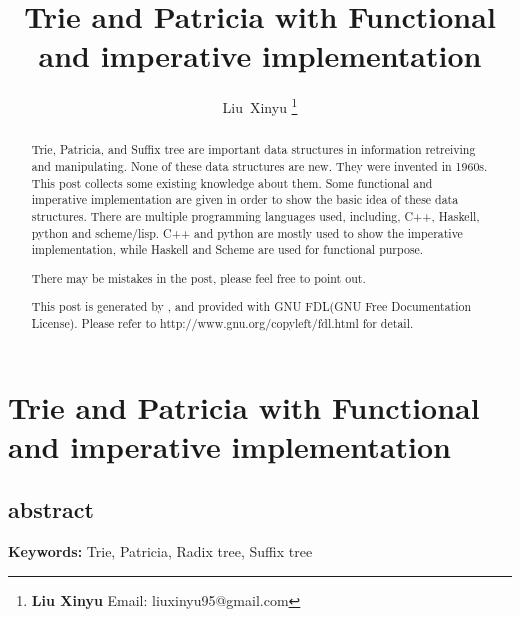\documentclass{article}
\begin{document}
\fi


\title{Trie and Patricia with Functional and imperative implementation}

\author{Liu~Xinyu
\thanks{{\bfseries Liu Xinyu } \newline
  Email: liuxinyu95@gmail.com \newline}
  }


\maketitle

\ifx\wholebook\relax
\chapter{Trie and Patricia with Functional and imperative implementation}

\section{abstract}
\else
\begin{abstract}
\fi
Trie, Patricia, and Suffix tree are important data structures in
information retreiving and manipulating. None of these data structures
are new. They were invented in 1960s. This post collects some
existing knowledge about them. Some functional and imperative
implementation are given in order to show the basic idea of these data structures.
There are multiple programming languages used, including, C++, Haskell, python and scheme/lisp.
C++ and python are mostly used to show the imperative implementation, while Haskell and Scheme are
used for functional purpose.

There may be mistakes in the post, please feel free to point out.

This post is generated by \LaTeXe, and provided with GNU FDL(GNU Free Documentation License).
Please refer to http://www.gnu.org/copyleft/fdl.html for detail.

\ifx\wholebook\relax\else
\end{abstract}
\fi

\vspace{3cm}
{\bfseries Keywords:} Trie, Patricia, Radix tree, Suffix tree
\end{document}
